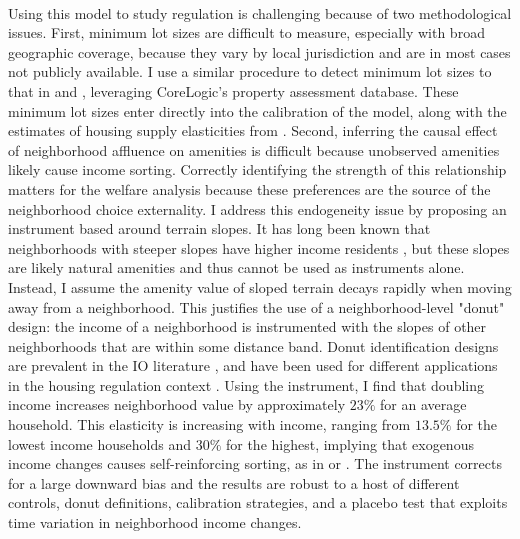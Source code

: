 \documentclass[12pt]{article}
\begin{document}
	\paragraph*{}
	Using this model to study regulation is challenging because of two methodological issues. First, minimum lot sizes are difficult to measure, especially with broad geographic coverage, because they vary by local jurisdiction and are in most cases not publicly available. I use a similar procedure to detect minimum lot sizes to that in \cite{Song} and \cite{Cui}, leveraging CoreLogic's property assessment database. These minimum lot sizes enter directly into the calibration of the model, along with the estimates of housing supply elasticities from \cite{BSH}. Second, inferring the causal effect of neighborhood affluence on amenities is difficult because unobserved amenities likely cause income sorting. Correctly identifying the strength of this relationship matters for the welfare analysis because these preferences are the source of the neighborhood choice externality. I address this endogeneity issue by proposing an instrument based around terrain slopes. It has long been known that neighborhoods with steeper slopes have higher income residents \citep{saiz2010}, but these slopes are likely natural amenities and thus cannot be used as instruments alone. Instead, I assume the amenity value of sloped terrain decays rapidly when moving away from a neighborhood. This justifies the use of a neighborhood-level "donut" design: the income of a neighborhood is instrumented with the slopes of other neighborhoods that are within some distance band. Donut identification designs are prevalent in the IO literature \citep{BFMJPE}, and have been used for different applications in the housing regulation context \citep{anagoletal2021}. Using the instrument, I find that doubling income increases neighborhood value by approximately $23\%$ for an average household. This elasticity is increasing with income, ranging from $13.5\%$ for the lowest income households and $30\%$ for the highest, implying that exogenous income changes causes self-reinforcing sorting, as in \cite{diamond2016} or \cite{su2021}. The instrument corrects for a large downward bias and the results are robust to a host of different controls, donut definitions, calibration strategies, and a placebo test that exploits time variation in neighborhood income changes.
\end{document}

